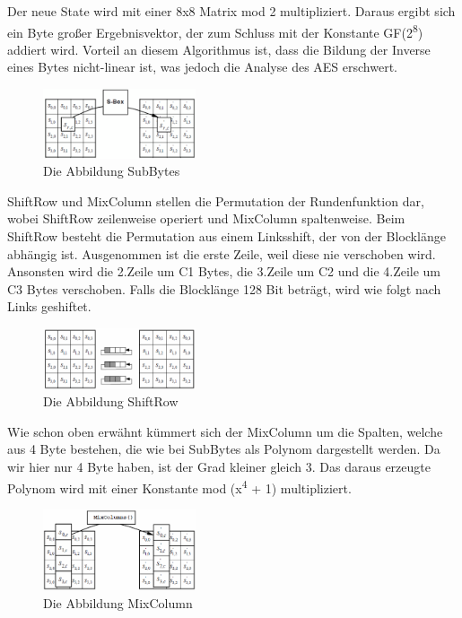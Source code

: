 \documentclass[11pt]{scrartcl}
\begin{document}
Der neue State wird mit einer 8x8 Matrix mod 2 multipliziert. Daraus ergibt sich ein Byte großer Ergebnisvektor, der zum Schluss mit der Konstante GF(2\textsuperscript{8}) addiert wird. Vorteil an diesem Algorithmus ist, dass die Bildung der Inverse eines Bytes nicht-linear ist, was jedoch die Analyse des AES erschwert. \cite{2}\cite{3}\\
\begin{figure}[H]
\includegraphics[width=0.40\textwidth]{Bilder/AES/AES_SubBytes}
	\caption{Die Abbildung SubBytes \cite{2}}
	\label{fig8}
\end{figure}
\noindent
ShiftRow und MixColumn stellen die Permutation der Rundenfunktion dar, wobei ShiftRow zeilenweise operiert und MixColumn spaltenweise. Beim ShiftRow besteht die Permutation aus einem Linksshift, der von der Blocklänge abhängig ist. Ausgenommen ist die erste Zeile, weil diese nie verschoben wird. Ansonsten wird die 2.Zeile um C1 Bytes, die 3.Zeile um C2 und die 4.Zeile um C3 Bytes verschoben. Falls die Blocklänge 128 Bit beträgt, wird wie folgt nach Links geshiftet. \cite{2}
\begin{figure}[H]
\includegraphics[width=0.40\textwidth]{Bilder/AES/AES_ShiftRow}
	\caption{Die Abbildung ShiftRow \cite{2}}
	\label{fig9}
\end{figure}
\noindent
Wie schon oben erwähnt kümmert sich der MixColumn um die Spalten, welche aus 4 Byte bestehen, die wie bei SubBytes als Polynom dargestellt werden. Da wir hier nur 4 Byte haben, ist der Grad kleiner gleich 3. Das daraus erzeugte Polynom wird mit einer Konstante mod (x\textsuperscript{4} + 1) multipliziert. \cite{2}
\begin{figure}[H]
\includegraphics[width=0.40\textwidth]{Bilder/AES/AES_MixColumn}
	\caption{Die Abbildung MixColumn \cite{2}}
	\label{fig10}
\end{figure}
\end{document}
